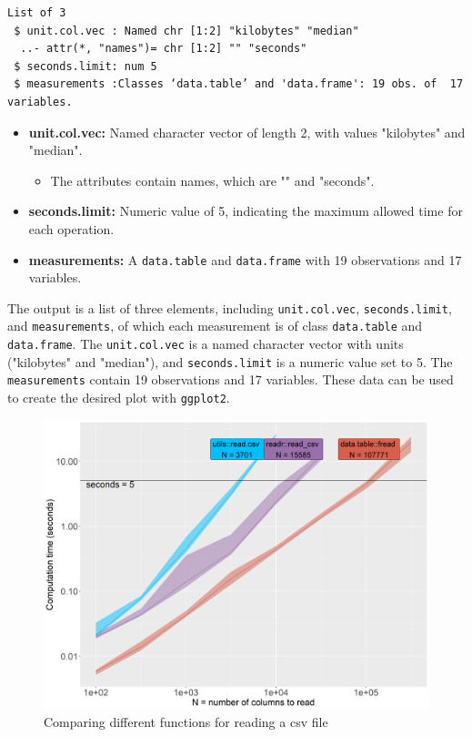 \begin{verbatim}
List of 3
 $ unit.col.vec : Named chr [1:2] "kilobytes" "median"
  ..- attr(*, "names")= chr [1:2] "" "seconds"
 $ seconds.limit: num 5
 $ measurements :Classes ‘data.table’ and 'data.frame':	19 obs. of  17 variables.
\end{verbatim}

\begin{itemize}
    \item \textbf{unit.col.vec:} Named character vector of length 2, with values "kilobytes" and "median".
    \begin{itemize}
        \item The attributes contain names, which are "" and "seconds".
    \end{itemize}

    \item \textbf{seconds.limit:} Numeric value of 5, indicating the maximum allowed time for each operation.

    \item \textbf{measurements:} A \texttt{data.table} and \texttt{data.frame} with 19 observations and 17 variables.
\end{itemize}

\noindent The output is a list of three elements, including \texttt{unit.col.vec}, \texttt{seconds.limit}, and \texttt{measurements}, of which each measurement is of class \texttt{data.table} and \texttt{data.frame}. The \texttt{unit.col.vec} is a named character vector with units ("kilobytes" and "median"), and \texttt{seconds.limit} is a numeric value set to 5. The \texttt{measurements} contain 19 observations and 17 variables. These data can be used to create the desired plot with \texttt{ggplot2}.


\begin{figure}[H]
    \centering
    \includegraphics[width=0.7\linewidth]{figures/gg.read.3.png}
    \caption{Comparing different functions for reading a csv file}
    \label{fig:label2}
\end{figure}

